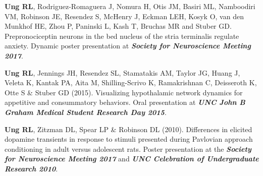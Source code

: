 \begin{etaremune}
    \item \textbf{Ung RL}, Rodriguez-Romaguera J, Nomura H, Otis JM, Basiri ML, Namboodiri VM, Robinson JE, Resendez S, McHenry J, Eckman LEH, Kosyk O, van den Munkhof HE, Zhou P, Paninski L, Kash T, Bruchas MR and Stuber GD. Prepronociceptin neurons in the bed nucleus of the stria terminalis regulate anxiety. Dynamic poster presentation at \textbf{\textit{Society for Neuroscience Meeting 2017}}.
    \item \textbf{Ung RL}, Jennings JH, Resendez SL, Stamatakis AM, Taylor JG, Huang J, Veleta K, Kantak PA, Aita M, Shilling-Scrivo K, Ramakrishnan C, Deisseroth K, Otte S \& Stuber GD (2015). Visualizing hypothalamic network dynamics for appetitive and consummatory behaviors. Oral presentation at \textbf{\textit{UNC John B Graham Medical Student Research Day 2015}}.
    \item \textbf{Ung RL}, Zitzman DL, Spear LP \& Robinson DL (2010). Differences in elicited dopamine transients in response to stimuli presented during Pavlovian approach conditioning in adult versus adolescent rats. Poster presentation at the \textbf{\textit{Society for Neuroscience Meeting 2017}} and \textbf{\textit{UNC Celebration of Undergraduate Research 2010}}.
\end{etaremune}